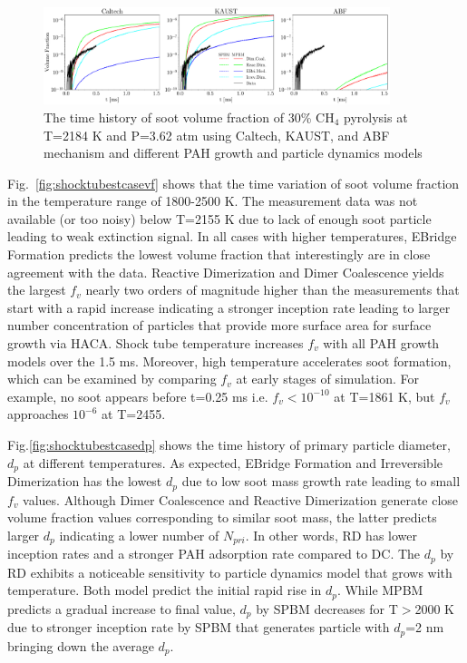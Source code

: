 \begin{figure}[H]
	\centering
	\includegraphics[width=0.9\textwidth]{Figures/Results/Shocktube/Stanford/june/stsh_mech_compare_vf.pdf}
	\caption{The time history of soot volume fraction of 30\% $\mathrm{CH_4}$ pyrolysis at T=2184 K and P=3.62 atm using Caltech, KAUST, and ABF mechanism and different PAH growth and particle dynamics models}
	\label{fig:shocktubestvf} 
\end{figure}

Fig.~\ref{fig:shocktubestcasevf} shows that the time variation of soot volume fraction in the temperature range of 1800-2500 K. The measurement data was not available (or too noisy) below T=2155 K due to lack of enough soot particle leading to weak extinction signal. In all cases with higher temperatures, EBridge Formation predicts the lowest volume fraction that interestingly are in close agreement with the data. Reactive Dimerization and Dimer Coalescence yields the largest $f_v$ nearly two orders of magnitude higher than the measurements that start with a rapid increase indicating a stronger inception rate leading to larger number concentration of particles that provide more surface area for surface growth via HACA. Shock tube temperature increases $f_v$ with all PAH growth models over the 1.5 ms. Moreover, high temperature accelerates soot formation, which can be examined by comparing $f_v$ at early stages of simulation. For example, no soot appears before t=0.25 ms i.e. $f_v<10^{-10}$ at T=1861 K, but $f_v$ approaches $10^{-6}$ at T=2455.

Fig.\ref{fig:shocktubestcasedp} shows the time history of primary particle diameter, $d_p$ at different temperatures. As expected, EBridge Formation and Irreversible Dimerization has the lowest $d_p$ due to low soot mass growth rate leading to small $f_v$ values. Although Dimer Coalescence and Reactive Dimerization generate close volume fraction values corresponding to similar soot mass, the latter predicts larger $d_p$ indicating a lower number of $N_{pri}$. In other words, RD has lower inception rates and a stronger PAH adsorption rate compared to DC. The $d_p$ by RD exhibits a noticeable sensitivity to particle dynamics model that grows with temperature. Both model predict the initial rapid rise in $d_p$. While MPBM predicts a gradual increase to final value, $d_p$ by SPBM decreases for T$>$2000 K due to stronger inception rate by SPBM that generates particle with $d_p$=2 nm bringing down the average $d_p$.

